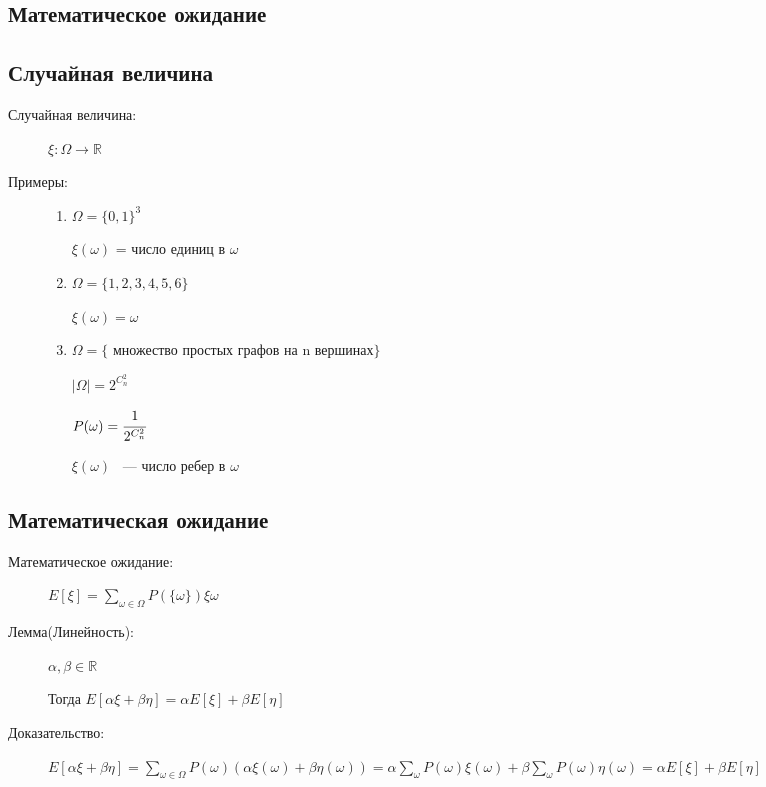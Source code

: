 \documentclass[12pt]{article}
\begin{document}
\begin{description}
\section{Математическое ожидание}

\subsection{Случайная величина}

\begin{description}
\item[Случайная величина:] $\xi : \Omega \to \mathbb R$

\item[Примеры:]

\begin{enumerate}
\item $\Omega = \{0, 1\}^3$

$\xi (\omega)$ = число единиц в $\omega$

\item $\Omega = \{1, 2, 3, 4, 5, 6\}$

$\xi (\omega) = \omega$

\item $\Omega = \{$ множество простых графов на n вершинах$\}$

$|\Omega| = 2^{C_n^2}$

$P(\omega) = \cfrac{1}{2^{C_n^2}}$

$\xi (\omega)$ ~--- число ребер в $\omega$
\end{enumerate}
\end{description}

\subsection{Математическая ожидание}

\begin{description}

\item[Математическое ожидание:] $E[\xi] = \sum_{\omega \in \Omega} P(\{\omega \}) \xi{\omega}$

\item[Лемма(Линейность):] $\alpha, \beta \in \mathbb R$

Тогда $E[\alpha \xi + \beta \eta] = \alpha E[\xi] + \beta E[\eta]$

\item[Доказательство:] 

$E[\alpha \xi + \beta \eta] = \sum_{\omega \in \Omega} P(\omega)(\alpha \xi(\omega) + \beta \eta(\omega)) = \alpha \sum_{\omega}P(\omega)\xi (\omega) + \beta \sum_{\omega}P(\omega)\eta (\omega) = \alpha E[\xi] + \beta E[\eta]$


\end{description}
\end{description}
\end{document}
